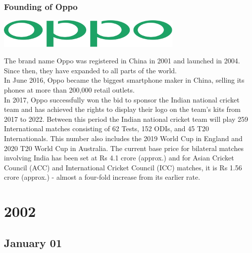 \documentclass[11pt]{report}
\begin{document}
\subsection{Founding of Oppo}
\vspace{2mm}\begin{center}\includegraphics[width=9cm]{./img/oppoLogo.jpg}\end{center}
The brand name Oppo was registered in China in 2001 and launched in 2004. Since then, they have expanded to all parts of the world.\\ \indent In June 2016, Oppo became the biggest smartphone maker in China, selling its phones at more than 200,000 retail outlets.\\
\indent In 2017, Oppo successfully won the bid to sponsor the Indian national cricket team and has achieved the rights to display their logo on the team’s kits from 2017 to 2022. Between this period the Indian national cricket team will play 259 International matches consisting of 62 Tests, 152 ODIs, and 45 T20 Internationals. This number also includes the 2019 World Cup in England and 2020 T20 World Cup in Australia. The current base price for bilateral matches involving India has been set at Rs 4.1 crore (approx.) and for Asian Cricket Council (ACC) and International Cricket Council (ICC) matches, it is Rs 1.56 crore (approx.) - almost a four-fold increase from its earlier rate.

\chapter{2002}
\section{January 01}
\end{document}
